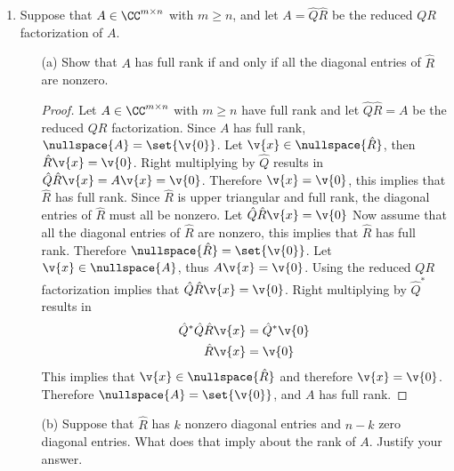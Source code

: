 \documentclass[11pt]{article}
\begin{document}
\begin{enumerate}
    \item %
        Suppose that $A \in \CC^{m \times n}$ with $m \ge n$, and let
        $A = \hat{Q}\hat{R}$ be the reduced $QR$ factorization of $A$.
        \begin{enumerate}
            \item[(a)]
                Show that $A$ has full rank if and only if all the diagonal
                entries of $\hat{R}$ are nonzero.

                \begin{proof}
                    Let $A \in \CC^{m \times n}$ with $m \ge n$ have full rank
                    and let $\hat{Q}\hat{R} = A$ be  the reduced $QR$ factorization.
                    Since $A$ has full rank, $\nullspace{A} = \set{\v{0}}$.
                    Let $\v{x} \in \nullspace{\hat{R}}$, then
                    $\hat{R}\v{x} = \v{0}$.
                    Right multiplying by $\hat{Q}$ results in
                    $\hat{Q}\hat{R}\v{x} = A\v{x} = \v{0}$.
                    Therefore $\v{x} = \v{0}$, this implies that
                    $\hat{R}$ has full rank.
                    Since $\hat{R}$ is upper triangular and full rank, the
                    diagonal entries of $\hat{R}$ must all be nonzero.
                    Let $\hat{Q}\hat{R}\v{x} = \v{0}$
                    Now assume that all the diagonal entries of $\hat{R}$ are
                    nonzero, this implies that $\hat{R}$ has full rank.
                    Therefore $\nullspace{\hat{R}} = \set{\v{0}}$.
                    Let $\v{x} \in \nullspace{A}$, thus $A \v{x} = \v{0}$.
                    Using the reduced $QR$ factorization implies that
                    $\hat{Q}\hat{R} \v{x} = \v{0}$.
                    Right multiplying by $\hat{Q}^*$ results in
                    \begin{align*}
                        \hat{Q}^*\hat{Q}\hat{R} \v{x} &= \hat{Q}^*\v{0} \\
                        \hat{R}\v{x} &= \v{0}
                    \end{align*}
                    This implies that $\v{x} \in \nullspace{\hat{R}}$ and
                    therefore $\v{x} = \v{0}$.
                    Therefore $\nullspace{A} = \set{\v{0}}$, and $A$ has full
                    rank.
                \end{proof}

            \item[(b)]
                Suppose that $\hat{R}$ has $k$ nonzero diagonal entries and
                $n - k$ zero diagonal entries.
                What does that imply about the rank of $A$.
                Justify your answer.


\end{enumerate}
\end{enumerate}
\end{document}
